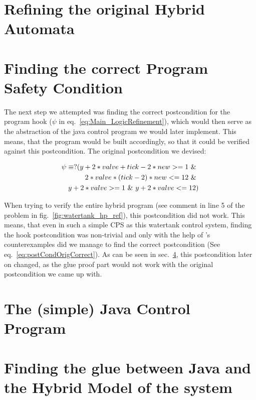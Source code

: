 \section{Refining the original Hybrid Automata}
\label{sec:Watertank:Refinining}

\section{Finding the correct Program Safety Condition}
\label{sec:Watertank:SafetyCond}

The next step we attempted was finding the correct postcondition for the program hook (\(\psi\) in eq.~\ref{eq:Main_LogicRefinement}), which would then serve as the abstraction of the java control program we would later implement. This means, that the program would be built accordingly, so that it could be verified against this postcondition. The original postcondition we devised:

\begin{equation}
	\centering
	\begin{split}
		\psi \equiv ?( y + 2* valve + tick -2 * new  >= 1~\&~ \\ 2 * valve * (tick - 2) * new <= 12~\&~ \\  y + 2* valve >= 1~\&~ y + 2 * valve <= 12) 
	\end{split}
\label{eq:postCondOrig}
\end{equation}

When trying to verify the entire hybrid program (see comment in line 5 of the problem in fig.~\ref{fig:watertank_hp_ref}), this postcondition did not work. This means, that even in such a simple CPS as this watertank control system, finding the hook postcondition was non-trivial and only with the help of \keym's counterexamples did we manage to find the correct postcondition (See eq.~\ref{eq:postCondOrigCorrect}). 
As can be seen in sec.~\ref{sec:Watertank:Glue}, this postcondition later on changed, as the glue proof part would not work with the original postcondition we came up with.

\section{The (simple) Java Control Program}
\label{sec:Watertank:Java}

\section{Finding the glue between Java and the Hybrid Model of the system}
\label{sec:Watertank:Glue}

